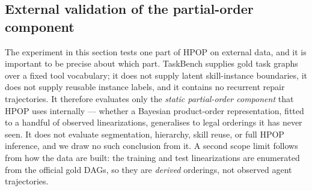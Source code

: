 %

\subsection{External validation of the partial-order component}
\label{sec:taskbench}

The experiment in this section tests one part of HPOP on external data, and it
is important to be precise about which part. TaskBench supplies gold task graphs
over a fixed tool vocabulary; it does not supply latent skill-instance
boundaries, it does not supply reusable instance labels, and it contains no
recurrent repair trajectories. It therefore evaluates only the \emph{static
partial-order component} that HPOP uses internally --- whether a Bayesian
product-order representation, fitted to a handful of observed linearizations,
generalises to legal orderings it has never seen. It does not evaluate
segmentation, hierarchy, skill reuse, or full HPOP inference, and we draw no
such conclusion from it. A second scope limit follows from how the data are
built: the training and test linearizations are enumerated from the official
gold DAGs, so they are \emph{derived} orderings, not observed agent
trajectories.

